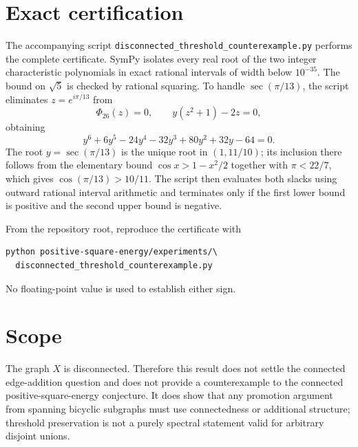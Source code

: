 \documentclass[11pt]{article}
\begin{document}
\section{Exact certification}
The accompanying script
\texttt{disconnected\_threshold\_counterexample.py} performs the complete
certificate.  SymPy isolates every real root of the two integer
characteristic polynomials in exact rational intervals of width below
$10^{-35}$.  The bound on $\sqrt5$ is checked by rational squaring.
To handle $\sec(\pi/13)$, the script eliminates
$z=e^{i\pi/13}$ from
\[
 \Phi_{26}(z)=0,
 \qquad y(z^2+1)-2z=0,
\]
obtaining
\[
 y^6+6y^5-24y^4-32y^3+80y^2+32y-64=0.
\]
The root $y=\sec(\pi/13)$ is the unique root in $(1,11/10)$; its inclusion
there follows from the elementary bound $\cos x>1-x^2/2$ together with
$\pi<22/7$, which gives $\cos(\pi/13)>10/11$.
The script then evaluates both slacks using outward
rational interval arithmetic and terminates only if the first lower bound
is positive and the second upper bound is negative.

From the repository root, reproduce the certificate with
\begin{verbatim}
python positive-square-energy/experiments/\
  disconnected_threshold_counterexample.py
\end{verbatim}
No floating-point value is used to establish either sign.

\section{Scope}
The graph $X$ is disconnected.  Therefore this result does not settle the
connected edge-addition question and does not provide a counterexample to
the connected positive-square-energy conjecture.  It does show that any
promotion argument from spanning bicyclic subgraphs must use connectedness
or additional structure; threshold preservation is not a purely spectral
statement valid for arbitrary disjoint unions.
\end{document}
